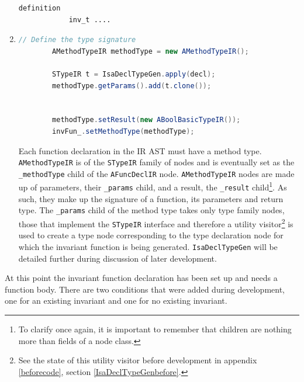\begin{enumerate}
\begin{lstlisting}[language = Isabelle]
		definition
			inv_t ....
	    \end{lstlisting}
	    \item \begin{lstlisting}[language=Java] 
		// Define the type signature
	    AMethodTypeIR methodType = new AMethodTypeIR();
	    
	    STypeIR t = IsaDeclTypeGen.apply(decl);
	    methodType.getParams().add(t.clone());
	    
	        
		methodType.setResult(new ABoolBasicTypeIR());
	    invFun_.setMethodType(methodType);
	    \end{lstlisting}
	    Each function declaration in the IR AST must have a method type. \lstinline[language=Java]{AMethodTypeIR} is of the \lstinline[language=Java]{STypeIR} family of nodes and is eventually set as the \lstinline[language=Java]{_methodType} child of the \lstinline[language=Java]{AFuncDeclIR} node. \lstinline[language=Java]{AMethodTypeIR} nodes are made up of parameters, their \lstinline[language=Java]{_params} child, and a result, the \lstinline[language=Java]{_result} child\footnote{To clarify once again, it is important to remember that children are nothing more than fields of a node class.}. As such, they make up the signature of a function, its parameters and return type. The \lstinline[language=Java]{_params} child of the method type takes only type family nodes, those that implement the \lstinline[language=Java]{STypeIR} interface and therefore a utility visitor\footnote{See the state of this utility visitor before development in appendix \ref{beforecode}, section \ref{IsaDeclTypeGenbefore}.} is used to create a type node corresponding to the type declaration node for which the invariant function is being generated. \lstinline[language=Java]{IsaDeclTypeGen} will be detailed further during discussion of later development. 
	\end{enumerate}

	At this point the invariant function declaration has been set up and needs a function body. There are two conditions that were added during development, one for an existing invariant and one for no existing invariant.

